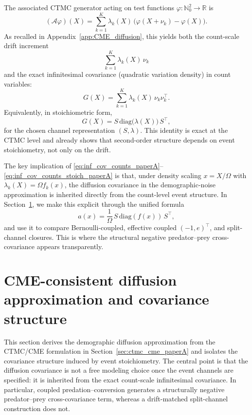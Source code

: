 \documentclass[pdflatex,sn-mathphys-ay]{sn-jnl}
\theoremstyle{thmstyleone}
\theoremstyle{definition}
\theoremstyle{remark}
\begin{document}
The associated CTMC generator acting on test functions \(\varphi:\mathbb N_0^2\to\mathbb R\) is
\begin{equation}
\label{eq:CTMC_generator_paperA}
(\mathcal A\varphi)(X)
=
\sum_{k=1}^{K}\lambda_k(X)\,\big(\varphi(X+\nu_k)-\varphi(X)\big).
\end{equation}
As recalled in Appendix~\ref{app:CME_diffusion}, this yields both the count-scale drift increment
\[
\sum_{k=1}^K \lambda_k(X)\,\nu_k
\]
and the exact infinitesimal covariance (quadratic variation density) in count variables:
\begin{equation}
\label{eq:inf_cov_counts_paperA}
G(X)=\sum_{k=1}^{K}\lambda_k(X)\,\nu_k\nu_k^\top.
\end{equation}
Equivalently, in stoichiometric form,
\begin{equation}
\label{eq:inf_cov_counts_stoich_paperA}
G(X)=S\,\mathrm{diag}\!\big(\lambda(X)\big)\,S^\top,
\end{equation}
for the chosen channel representation \((S,\lambda)\). This identity is exact at the CTMC level and already shows that second-order structure depends on event stoichiometry, not only on the drift.

The key implication of \eqref{eq:inf_cov_counts_paperA}--\eqref{eq:inf_cov_counts_stoich_paperA} is that, under density scaling \(x=X/\Omega\) with \(\lambda_k(X)=\Omega f_k(x)\), the diffusion covariance in the demographic-noise approximation is inherited directly from the count-level event structure. In Section~\ref{sec:diffusion_covariance_paperA}, we make this explicit through the unified formula
\[
a(x)=\frac{1}{\Omega}\,S\,\mathrm{diag}(f(x))\,S^\top,
\]
and use it to compare Bernoulli-coupled, effective coupled \(({-1},e)^\top\), and split-channel closures. This is where the structural negative predator--prey cross-covariance appears transparently.






\section{CME-consistent diffusion approximation and covariance structure}
\label{sec:diffusion_covariance_paperA}

This section derives the demographic diffusion approximation from the CTMC/CME formulation in Section~\ref{sec:ctmc_cme_paperA} and isolates the covariance structure induced by event stoichiometry. The central point is that the diffusion covariance is not a free modeling choice once the event channels are specified: it is inherited from the exact count-scale infinitesimal covariance. In particular, coupled predation--conversion generates a structurally negative predator--prey cross-covariance term, whereas a drift-matched split-channel construction does not.
\end{document}
